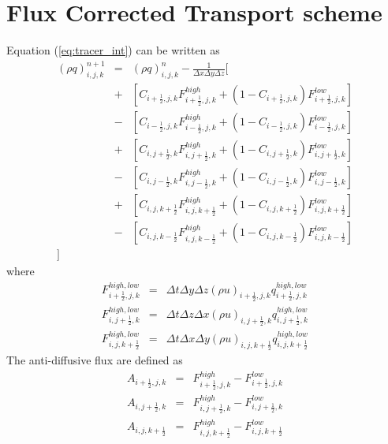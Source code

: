 \section{Flux Corrected Transport scheme}
Equation (\ref{eq:tracer_int}) can be written as
\begin{eqnarray}
\left(\rho q\right)^{n+1}_{i,j,k} 
&=& \left(\rho q\right)^{n}_{i,j,k}
- \frac{1}{\Delta x \Delta y \Delta z}
\big[ \nonumber\\
&+&
\left[ C_{i+\frac{1}{2},j,k} F_{i+\frac{1}{2},j,k}^{high}
+ \left( 1 - C_{i+\frac{1}{2},j,k}\right) F_{i+\frac{1}{2},j,k}^{low}\right]\nonumber\\
&-&
\left[ C_{i-\frac{1}{2},j,k} F_{i-\frac{1}{2},j,k}^{high}
+ \left( 1 - C_{i-\frac{1}{2},j,k}\right) F_{i-\frac{1}{2},j,k}^{low}\right]\nonumber\\
&+&
\left[ C_{i,j+\frac{1}{2},k} F_{i,j+\frac{1}{2},k}^{high}
+ \left( 1 - C_{i,j+\frac{1}{2},k}\right) F_{i,j+\frac{1}{2},k}^{low}\right]\nonumber\\
&-&
\left[ C_{i,j-\frac{1}{2},k} F_{i,j-\frac{1}{2},k}^{high}
+ \left( 1 - C_{i,j-\frac{1}{2},k}\right) F_{i,j-\frac{1}{2},k}^{low}\right]\nonumber\\
&+&
\left[ C_{i,j,k+\frac{1}{2}} F_{i,j,k+\frac{1}{2}}^{high}
+ \left( 1 - C_{i,j,k+\frac{1}{2}}\right) F_{i,j,k+\frac{1}{2}}^{low}\right]\nonumber\\
&-&
\left[ C_{i,j,k-\frac{1}{2}} F_{i,j,k-\frac{1}{2}}^{high}
+ \left( 1 - C_{i,j,k-\frac{1}{2}}\right) F_{i,j,k-\frac{1}{2}}^{low}\right]\nonumber\\
\big]
\label{eq:1step_integ_tracer}
\end{eqnarray}
where
\begin{eqnarray}
  F_{i+\frac{1}{2},j,k}^{high,low} &=& \Delta t \Delta y \Delta z (\rho u)_{i+\frac{1}{2},j,k} q_{i+\frac{1}{2},j,k}^{high,low}\\
  F_{i,j+\frac{1}{2},k}^{high,low} &=& \Delta t \Delta z \Delta x (\rho u)_{i,j+\frac{1}{2},k} q_{i,j+\frac{1}{2},k}^{high,low}\\
  F_{i,j,k+\frac{1}{2}}^{high,low} &=& \Delta t \Delta x \Delta y (\rho u)_{i,j,k+\frac{1}{2}} q_{i,j,k+\frac{1}{2}}^{high,low}
\end{eqnarray}
The anti-diffusive flux are defined as
\begin{eqnarray}
  A_{i+\frac{1}{2},j,k} &=& F_{i+\frac{1}{2},j,k}^{high}-F_{i+\frac{1}{2},j,k}^{low}\\
  A_{i,j+\frac{1}{2},k} &=& F_{i,j+\frac{1}{2},k}^{high}-F_{i,j+\frac{1}{2},k}^{low}\\
  A_{i,j,k+\frac{1}{2}} &=& F_{i,j,k+\frac{1}{2}}^{high}-F_{i,j,k+\frac{1}{2}}^{low}
\end{eqnarray}

